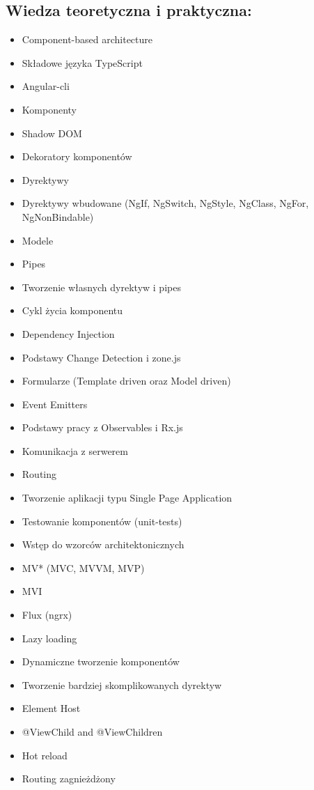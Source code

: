 \documentclass{article}[10pt]
\begin{document}
	\subsection*{Wiedza teoretyczna i praktyczna:}
\begin{adjustwidth}{1.5cm}{}
	\begin{itemize}
		\item Component-based architecture
		\item Składowe języka TypeScript
		\item Angular-cli
		\item Komponenty
		\item Shadow DOM
		\item Dekoratory komponentów
		\item Dyrektywy
		\item Dyrektywy wbudowane (NgIf, NgSwitch, NgStyle, NgClass, NgFor, NgNonBindable)
		\item Modele
		\item Pipes
		\item Tworzenie własnych dyrektyw i pipes
		\item Cykl życia komponentu
		\item Dependency Injection
		\item Podstawy Change Detection i zone.js
		\item Formularze (Template driven oraz Model driven)
		\item Event Emitters
		\item Podstawy pracy z Observables i Rx.js
		\item Komunikacja z serwerem
		\item Routing
		\item Tworzenie aplikacji typu Single Page Application
		\item Testowanie komponentów (unit-tests)
		\item Wstęp do wzorców architektonicznych
		\item MV* (MVC, MVVM, MVP)
		\item MVI
		\item Flux (ngrx)
		\item Lazy loading
		\item Dynamiczne tworzenie komponentów
		\item Tworzenie bardziej skomplikowanych dyrektyw
		\item Element Host
		\item @ViewChild and @ViewChildren
		\item Hot reload
		\item Routing zagnieżdżony

\end{itemize}
\end{adjustwidth}
\end{document}
